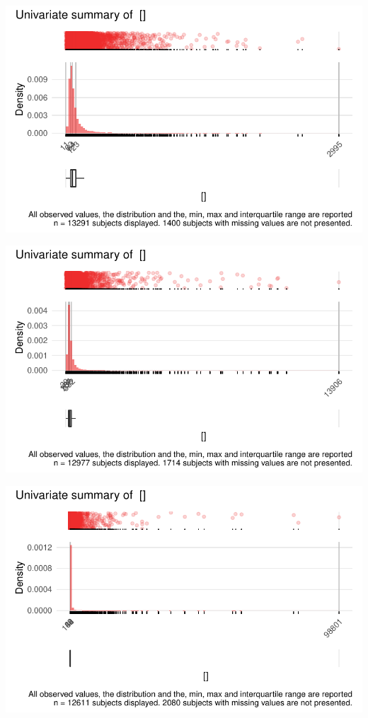 \documentclass[
  letterpaper,
  DIV=11,
  numbers=noendperiod]{scrreport}
\begin{document}
\includegraphics{./Bact_univar_files/figure-pdf/uni04-26.pdf}

\includegraphics{./Bact_univar_files/figure-pdf/uni04-27.pdf}

\includegraphics{./Bact_univar_files/figure-pdf/uni04-28.pdf}
\end{document}
